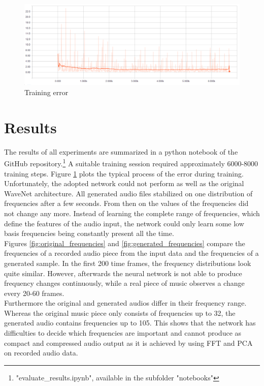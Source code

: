 \documentclass[10pt,conference,compsocconf]{IEEEtran}
\begin{document}
\begin{figure}[tbp]
  \centering
  \includegraphics[width=\columnwidth]{figures/loss.png}
  \caption{Training error}
  \label{fig:training_error}
\end{figure}
\section{Results}
The results of all experiments are summarized in a python notebook of the GitHub repository.\footnote{"evaluate\_results.ipynb", available in the subfolder "notebooks"} A suitable training session required approximately 6000-8000 training steps. Figure \ref{fig:training_error} plots the typical process of the error during training.\\
 Unfortunately, the adopted network could not perform as well as the original WaveNet architecture. All generated audio files stabilized on one distribution of frequencies after a few seconds. From then on the values of the frequencies did not change any more. Instead of learning the complete range of frequencies, which define the features of the audio input, the network could only learn some low basis frequencies being constantly present all the time.\\
Figures \ref{fig:original_frequencies} and \ref{fig:generated_frequencies} compare the frequencies of a recorded audio piece from the input data and the frequencies of a generated sample. In the first 200 time frames, the frequency distributions look quite similar. However, afterwards the neural network is not able to produce frequency changes continuously, while a real piece of music observes a change every 20-60 frames.\\
Furthermore the original and generated audios differ in their frequency range. Whereas the original music piece only consists of frequencies up to 32, the generated audio contains frequencies up to 105. This shows that the network has difficulties to decide which frequencies are important and cannot produce as compact and compressed audio output as it is achieved by using FFT and PCA on recorded audio data.\\
\end{document}
